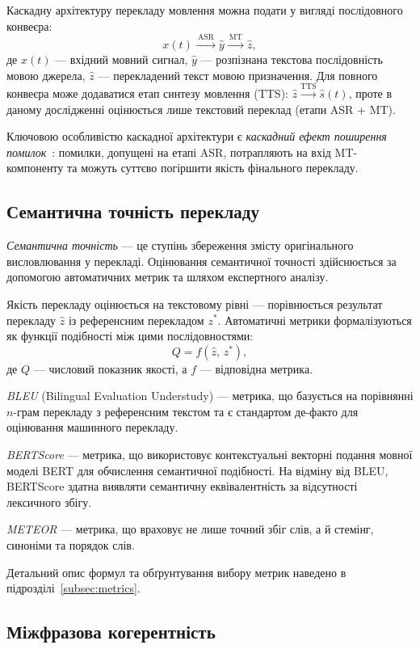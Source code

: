Каскадну архітектуру перекладу мовлення можна подати у вигляді
послідовного конвеєра:
\[
x(t) \xrightarrow{\ \text{ASR}\ } \hat{y} \xrightarrow{\ \text{MT}\ } \hat{z},
\]
де $x(t)$ --- вхідний мовний сигнал, $\hat{y}$ --- розпізнана текстова
послідовність мовою джерела, $\hat{z}$ --- перекладений текст мовою
призначення. Для повного конвеєра може додаватися етап синтезу мовлення
(TTS): $\hat{z} \xrightarrow{\text{TTS}} \hat{s}(t)$, проте в даному
дослідженні оцінюється лише текстовий переклад (етапи ASR + MT).

Ключовою особливістю каскадної архітектури є \textit{каскадний ефект
поширення помилок}~\cite{error_propagation}: помилки, допущені на
етапі ASR, потрапляють на вхід MT-компоненту та можуть суттєво
погіршити якість фінального перекладу.

\subsection{Семантична точність перекладу}

\textit{Семантична точність} --- це ступінь збереження змісту оригінального
висловлювання у перекладі. Оцінювання семантичної точності здійснюється за
допомогою автоматичних метрик та шляхом експертного аналізу.

Якість перекладу оцінюється на текстовому рівні --- порівнюється результат
перекладу $\hat{z}$ із референсним перекладом $z^*$. Автоматичні метрики
формалізуються як функції подібності між цими послідовностями:
\[
Q = f(\hat{z},\, z^*),
\]
де $Q$ --- числовий показник якості, а $f$ --- відповідна метрика.

\textit{BLEU} (Bilingual Evaluation Understudy) \cite{papineni_bleu} --- метрика,
що базується на порівнянні $n$-грам перекладу з референсним текстом та є
стандартом де-факто для оцінювання машинного перекладу.

\textit{BERTScore} \cite{bert_score} --- метрика, що використовує контекстуальні
векторні подання мовної моделі BERT для обчислення семантичної подібності.
На відміну від BLEU, BERTScore здатна виявляти семантичну еквівалентність
за відсутності лексичного збігу.

\textit{METEOR} \cite{banerjee_meteor} --- метрика, що враховує не лише точний
збіг слів, а й стемінг, синоніми та порядок слів.

Детальний опис формул та обґрунтування вибору метрик наведено в
підрозділі~\ref{subsec:metrics}.

\subsection{Міжфразова когерентність}

